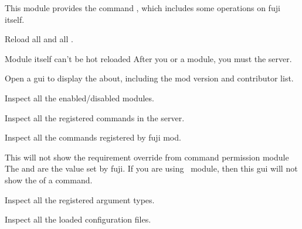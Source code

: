 \label{ch:fuji}

This module provides the command , which includes some operations on fuji itself.

Reload all  and all .

\begin{note}{Module itself can't be hot reloaded}
    After you  or  a module, you must  the server.
\end{note}

Open a gui to display the about, including the mod version and contributor list.

Inspect all the enabled/disabled modules.

Inspect all the registered commands in the server.

Inspect all the commands registered by fuji mod.

\begin{note}{This will not show the requirement override from command permission module}
    The  and  are the  value set by fuji.
    If you are using~ module, then this gui will not show the  of a command.
\end{note}

Inspect all the registered argument types.

Inspect all the loaded configuration files.

